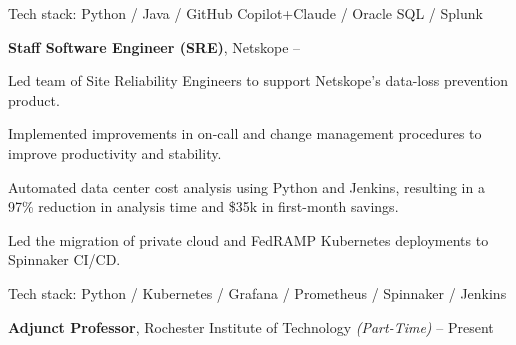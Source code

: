\documentclass[MMMMyyyy,nonstopmode]{simpleresumecv_stacked}
\newcommand{\tech}[1]{\Gap Tech stack: #1}
\newcommand{\techsep}{/ }
\begin{document}
\begin{Body}
\tech{Python \techsep Java \techsep GitHub Copilot+Claude \techsep Oracle SQL \techsep Splunk}


\BigGap

\Entry
\textbf{Staff Software Engineer (SRE)}, Netskope
\hfill
 -- 

\begin{Detail}

Led team of Site Reliability Engineers to support Netskope's data-loss prevention product.

\Gap


\BulletItem
Implemented improvements in on-call and change management procedures to improve productivity and stability.

\BulletItem
Automated data center cost analysis using Python and Jenkins, resulting in a 97\% reduction in analysis time and \$35k in first-month savings.


\BulletItem
Led the migration of private cloud and FedRAMP Kubernetes deployments to Spinnaker CI/CD.



\end{Detail}

\tech{Python \techsep Kubernetes \techsep Grafana \techsep Prometheus \techsep Spinnaker \techsep Jenkins}

\BigGap

\iffalse %
\Entry
\textbf{Adjunct Professor}, Rochester Institute of Technology \textit{(Part-Time)}
\hfill
 --
Present


\end{Body}
\end{document}
